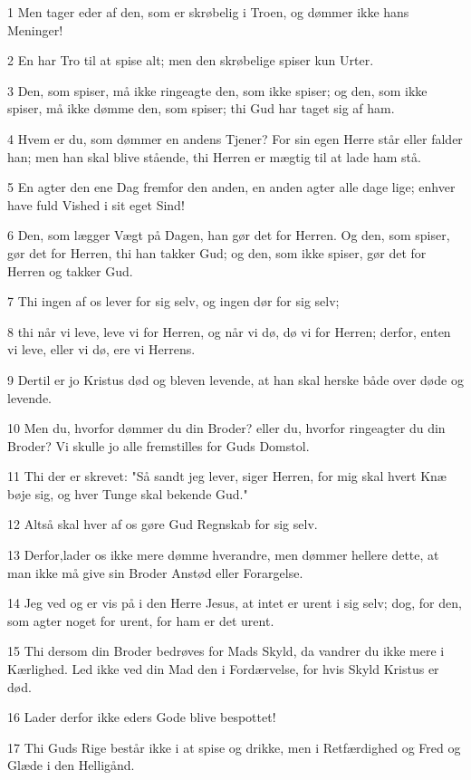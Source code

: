 \par 1 Men tager eder af den, som er skrøbelig i Troen, og dømmer ikke hans Meninger!
\par 2 En har Tro til at spise alt; men den skrøbelige spiser kun Urter.
\par 3 Den, som spiser, må ikke ringeagte den, som ikke spiser; og den, som ikke spiser, må ikke dømme den, som spiser; thi Gud har taget sig af ham.
\par 4 Hvem er du, som dømmer en andens Tjener? For sin egen Herre står eller falder han; men han skal blive stående, thi Herren er mægtig til at lade ham stå.
\par 5 En agter den ene Dag fremfor den anden, en anden agter alle dage lige; enhver have fuld Vished i sit eget Sind!
\par 6 Den, som lægger Vægt på Dagen, han gør det for Herren. Og den, som spiser, gør det for Herren, thi han takker Gud; og den, som ikke spiser, gør det for Herren og takker Gud.
\par 7 Thi ingen af os lever for sig selv, og ingen dør for sig selv;
\par 8 thi når vi leve, leve vi for Herren, og når vi dø, dø vi for Herren; derfor, enten vi leve, eller vi dø, ere vi Herrens.
\par 9 Dertil er jo Kristus død og bleven levende, at han skal herske både over døde og levende.
\par 10 Men du, hvorfor dømmer du din Broder? eller du, hvorfor ringeagter du din Broder? Vi skulle jo alle fremstilles for Guds Domstol.
\par 11 Thi der er skrevet: "Så sandt jeg lever, siger Herren, for mig skal hvert Knæ bøje sig, og hver Tunge skal bekende Gud."
\par 12 Altså skal hver af os gøre Gud Regnskab for sig selv.
\par 13 Derfor,lader os ikke mere dømme hverandre, men dømmer hellere dette, at man ikke må give sin Broder Anstød eller Forargelse.
\par 14 Jeg ved og er vis på i den Herre Jesus, at intet er urent i sig selv; dog, for den, som agter noget for urent, for ham er det urent.
\par 15 Thi dersom din Broder bedrøves for Mads Skyld, da vandrer du ikke mere i Kærlighed. Led ikke ved din Mad den i Fordærvelse, for hvis Skyld Kristus er død.
\par 16 Lader derfor ikke eders Gode blive bespottet!
\par 17 Thi Guds Rige består ikke i at spise og drikke, men i Retfærdighed og Fred og Glæde i den Helligånd.
